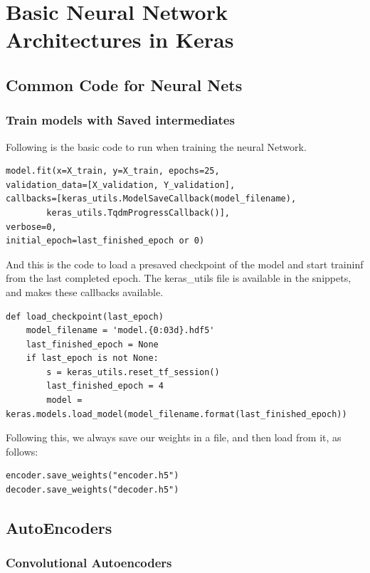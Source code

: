 \chapter{Basic Neural Network Architectures in Keras}

\section{Common Code for Neural Nets}


\subsection{Train models with Saved intermediates}


Following is the basic code to run when training the neural Network.

\begin{lstlisting}[style=py]
model.fit(x=X_train, y=X_train, epochs=25,
validation_data=[X_validation, Y_validation],
callbacks=[keras_utils.ModelSaveCallback(model_filename),
        keras_utils.TqdmProgressCallback()],
verbose=0,
initial_epoch=last_finished_epoch or 0)
\end{lstlisting}

And this is the code to load a presaved checkpoint of the model and start traininf from the last completed epoch. The keras\_utils file is available in the snippets, and makes these callbacks available.

\begin{lstlisting}[style=py]
def load_checkpoint(last_epoch)
    model_filename = 'model.{0:03d}.hdf5'
    last_finished_epoch = None
    if last_epoch is not None:
        s = keras_utils.reset_tf_session()
        last_finished_epoch = 4
        model = keras.models.load_model(model_filename.format(last_finished_epoch))
\end{lstlisting}

Following this, we always save our weights in a file, and then load from it, as follows:
\begin{lstlisting}[style=py]
encoder.save_weights("encoder.h5")
decoder.save_weights("decoder.h5")
\end{lstlisting}



\section{AutoEncoders}

\subsection{Convolutional Autoencoders}

